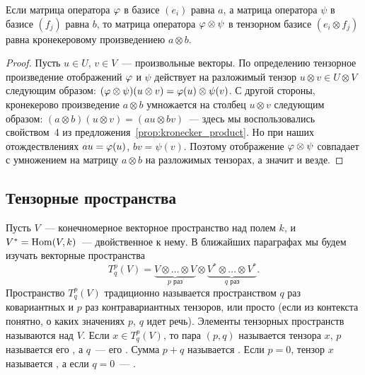 \begin{theorem}
Если матрица оператора $\varphi$ в базисе $(e_i)$ равна $a$, а матрица
оператора $\psi$ в базисе $(f_j)$ равна $b$, то матрица оператора
$\varphi\otimes\psi$ в тензорном базисе $(e_i\otimes f_j)$ равна
кронекеровому произведениею $a\otimes b$.
\end{theorem}
\begin{proof}
Пусть $u\in U$, $v\in V$~--- произвольные векторы. По определению
тензорное произведение отображений $\varphi$ и $\psi$ действует на
разложимый тензор $u\otimes v\in U\otimes V$ следующим образом:
$(\varphi\otimes\psi)(u\otimes v) = \varphi(u)\otimes\psi(v)$.
С другой стороны, кронекерово произведение $a\otimes b$ умножается на
столбец $u\otimes v$ следующим образом:
$(a\otimes b)(u\otimes v) = (au\otimes bv)$~--- здесь мы
воспользовались свойством~4 из
предложения~\ref{prop:kronecker_product}.
Но при наших отождествлениях $au = \varphi(u)$, $bv = \psi(v)$. Поэтому
отображение $\varphi\otimes\psi$ совпадает с умножением на матрицу
$a\otimes b$ на разложимых тензорах, а значит и везде.
\end{proof}

\subsection{Тензорные пространства}


Пусть $V$~--- конечномерное векторное пространство над полем $k$, и
$V^* = \operatorname{Hom}(V,k)$~--- двойственное к нему. В ближайших
параграфах мы будем изучать векторные пространства
$$
T^p_q(V) = \underbrace{V\otimes\dots\otimes V}_{p\mbox{ раз}} \otimes
\underbrace{V^*\otimes\dots\otimes V^*}_{q\mbox{ раз}}.
$$
Пространство $T^p_q(V)$ традиционно называется пространством $q$ раз
ковариантных и $p$ раз контравариантных тензоров, или просто
 (если из
контекста понятно, о каких значениях $p$, $q$ идет речь). Элементы
тензорных пространств называются  над
$V$. Если $x\in T^p_q(V)$, то пара $(p,q)$ называется
 тензора $x$, $p$ называется его
, а 
$q$~--- его . Сумма $p+q$
называется . Если
$p=0$, тензор $x$ называется , а если $q=0$~---
.

